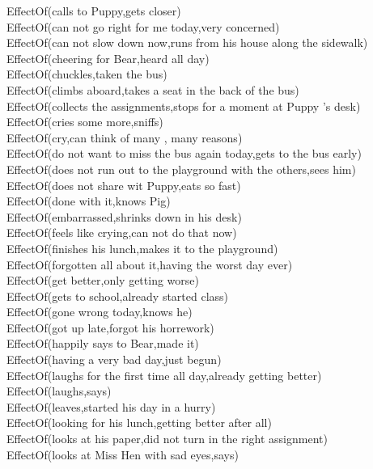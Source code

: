 \begin{multicols}{2}
\begin{footnotesize}
EffectOf(calls to Puppy,gets closer) \\
EffectOf(can not go right for me today,very concerned) \\
EffectOf(can not slow down now,runs from his house along the sidewalk) \\
EffectOf(cheering for Bear,heard all day) \\
EffectOf(chuckles,taken the bus) \\
EffectOf(climbs aboard,takes a seat in the back of the bus) \\
EffectOf(collects the assignments,stops for a moment at Puppy 's desk) \\
EffectOf(cries some more,sniffs) \\
EffectOf(cry,can think of many , many reasons) \\
EffectOf(do not want to miss the bus again today,gets to the bus early) \\
EffectOf(does not run out to the playground with the others,sees him) \\
EffectOf(does not share wit Puppy,eats so fast) \\
EffectOf(done with it,knows Pig) \\
EffectOf(embarrassed,shrinks down in his desk) \\
EffectOf(feels like crying,can not do that now) \\
EffectOf(finishes his lunch,makes it to the playground) \\
EffectOf(forgotten all about it,having the worst day ever) \\
EffectOf(get better,only getting worse) \\
EffectOf(gets to school,already started class) \\
EffectOf(gone wrong today,knows he) \\
EffectOf(got up late,forgot his horrework) \\
EffectOf(happily says to Bear,made it) \\
EffectOf(having a very bad day,just begun) \\
EffectOf(laughs for the first time all day,already getting better) \\
EffectOf(laughs,says) \\
EffectOf(leaves,started his day in a hurry) \\
EffectOf(looking for his lunch,getting better after all) \\
EffectOf(looks at his paper,did not turn in the right assignment) \\
EffectOf(looks at Miss Hen with sad eyes,says) \\

\end{footnotesize}
\end{multicols}
